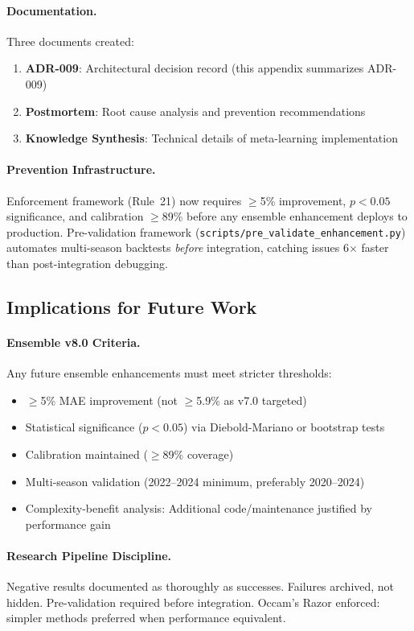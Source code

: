 \paragraph{Documentation.}
Three documents created:
\begin{enumerate}
  \item \textbf{ADR-009}: Architectural decision record (this appendix summarizes ADR-009)
  \item \textbf{Postmortem}: Root cause analysis and prevention recommendations
  \item \textbf{Knowledge Synthesis}: Technical details of meta-learning implementation
\end{enumerate}

\paragraph{Prevention Infrastructure.}
Enforcement framework (Rule~21) now requires $\ge$5\% improvement, $p<0.05$ significance, and calibration $\ge$89\% before any ensemble enhancement deploys to production. Pre-validation framework (\texttt{scripts/pre\_validate\_enhancement.py}) automates multi-season backtests \textit{before} integration, catching issues 6$\times$ faster than post-integration debugging.

\subsection{Implications for Future Work}

\paragraph{Ensemble v8.0 Criteria.}
Any future ensemble enhancements must meet stricter thresholds:
\begin{itemize}
  \item $\ge$5\% MAE improvement (not $\ge$5.9\% as v7.0 targeted)
  \item Statistical significance ($p<0.05$) via Diebold-Mariano or bootstrap tests
  \item Calibration maintained ($\ge$89\% coverage)
  \item Multi-season validation (2022--2024 minimum, preferably 2020--2024)
  \item Complexity-benefit analysis: Additional code/maintenance justified by performance gain
\end{itemize}

\paragraph{Research Pipeline Discipline.}
Negative results documented as thoroughly as successes. Failures archived, not hidden. Pre-validation required before integration. Occam's Razor enforced: simpler methods preferred when performance equivalent.

